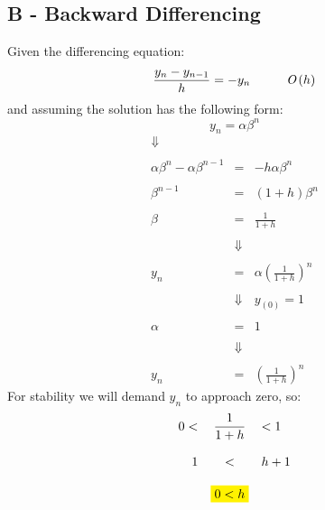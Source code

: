 \documentclass[11pt, a4paper]{article}
\begin{document}
\subsection{B - Backward Differencing}
Given the differencing equation:
\begin{equation}
    \frac{y_{n}-y_{n-1}}{h}=-y_n\hspace{1cm}\emph{O}\left(h\right)
\end{equation}
and assuming the solution has the following form:
\begin{equation}
    y_n=\alpha\beta^n
\end{equation}
\begin{equation}
    \begin{array}{rcl}
        \Downarrow \\\\
        \alpha\beta^n - \alpha\beta^{n-1} & = & -h\alpha\beta^n \\\\
        \beta^{n-1} & = & \left(1+h\right)\beta^n \\\\
        \beta & = & \displaystyle\frac{1}{1+h} \\\\
        & \Downarrow & \\\\
        y_n & = & \alpha\left(\displaystyle\frac{1}{1+h}\right)^n \\\\
        & \Downarrow & y_{\left(0\right)}=1 \\\\
        \alpha & = & 1 \\\\
        & \Downarrow & \\\\
        y_n & = & \left(\displaystyle\frac{1}{1+h}\right)^n
    \end{array}
\end{equation}
For stability we will demand $y_n$ to approach zero, so:
\begin{equation}
    \begin{array}{rcl}
        0<&\displaystyle\frac{1}{1+h}&<1 \\\\
        1&<&h+1 \\\\
        &\colorbox{yellow}{$0<h$}&
    \end{array}
\end{equation}
\end{document}
